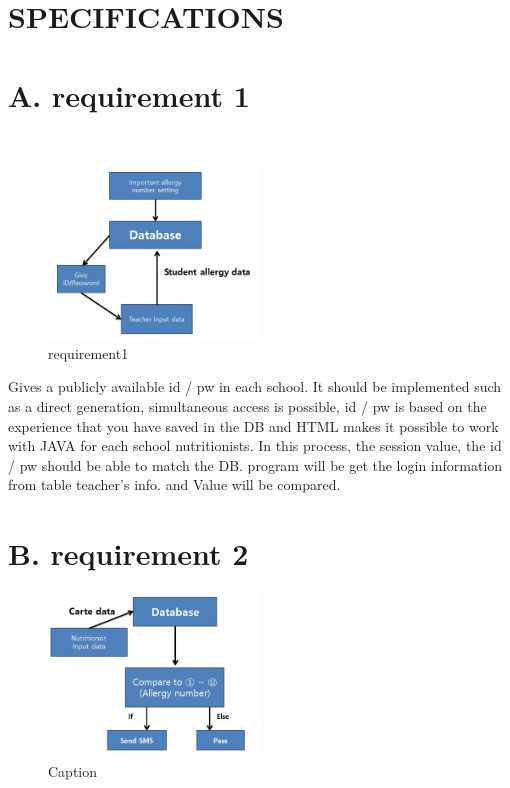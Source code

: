 \documentclass[a4paper,11pt]{IEEEtran}
\begin{document}
{\large
\section{SPECIFICATIONS}

\section*{A. requirement 1}
~\\

\begin{figure}[!h]
        \centering
        \includegraphics[width=0.5\textwidth, height=0.4\textheight]{r1.jpg}
        \caption{requirement1}
        \label{fig1}
\end{figure}

Gives a publicly available id / pw in each school. It should be implemented such as a direct generation, simultaneous access is possible, id / pw is based on the experience that you have saved in the DB and HTML makes it possible to work with JAVA for each school nutritionists. In this process, the session value, the id / pw should be able to match the DB. program will be get the login information from table teacher's info. and Value will be compared.
\section*{B. requirement 2}

\begin{figure}[!h]
        \centering
        \includegraphics[width=0.5\textwidth, height=0.5\textheight]{r2.jpg}
        \caption{Caption}
        \label{fig1}
\end{figure}

}
\end{document}
